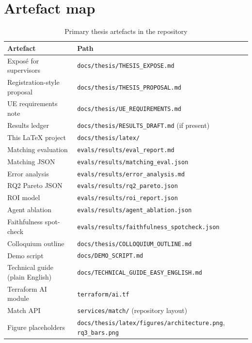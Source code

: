 \chapter{Artefact map}
\label{app:artefacts}

\begin{table}[ht]
\centering
\caption{Primary thesis artefacts in the repository}
\label{tab:artefacts}
\begin{tabularx}{\textwidth}{@{}lX@{}}
\toprule
\textbf{Artefact} & \textbf{Path} \\
\midrule
Expos\'e for supervisors & \texttt{docs/thesis/THESIS\_EXPOSE.md} \\
Registration-style proposal & \texttt{docs/thesis/THESIS\_PROPOSAL.md} \\
UE requirements note & \texttt{docs/thesis/UE\_REQUIREMENTS.md} \\
Results ledger & \texttt{docs/thesis/RESULTS\_DRAFT.md} (if present) \\
This \LaTeX{} project & \texttt{docs/thesis/latex/} \\
Matching evaluation & \texttt{evals/results/eval\_report.md} \\
Matching JSON & \texttt{evals/results/matching\_eval.json} \\
Error analysis & \texttt{evals/results/error\_analysis.md} \\
RQ2 Pareto JSON & \texttt{evals/results/rq2\_pareto.json} \\
ROI model & \texttt{evals/results/roi\_report.json} \\
Agent ablation & \texttt{evals/results/agent\_ablation.json} \\
Faithfulness spot-check & \texttt{evals/results/faithfulness\_spotcheck.json} \\
Colloquium outline & \texttt{docs/thesis/COLLOQUIUM\_OUTLINE.md} \\
Demo script & \texttt{docs/DEMO\_SCRIPT.md} \\
Technical guide (plain English) & \texttt{docs/TECHNICAL\_GUIDE\_EASY\_ENGLISH.md} \\
Terraform AI module & \texttt{terraform/ai.tf} \\
Match API & \texttt{services/match/} (repository layout) \\
Figure placeholders & \texttt{docs/thesis/latex/figures/architecture.png}, \texttt{rq3\_bars.png} \\
\bottomrule
\end{tabularx}
\end{table}

